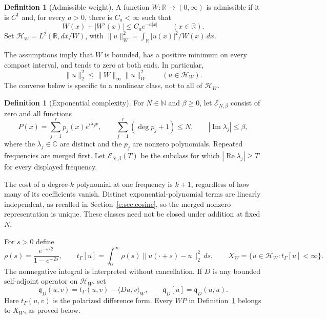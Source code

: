 \documentclass[11pt,a4paper]{article}
\numberwithin{equation}{section}
\theoremstyle{definition}\newtheorem{definition}[theorem]{Definition}
\theoremstyle{remark}\newtheorem{remark}[theorem]{Remark}
\newcommand{\R}{\mathbb R}\newcommand{\C}{\mathbb C}\newcommand{\N}{\mathbb N}
\newcommand{\HH}{\mathcal H_W}\newcommand{\XX}{X_W}\newcommand{\EE}{\mathcal E_{N,\beta}}
\newcommand{\tg}{t_\Gamma}\newcommand{\cg}{c_\Gamma}
\newcommand{\qD}{\mathfrak q_D}\newcommand{\qth}{\mathfrak q_\theta}
\newcommand{\ip}[2]{\langle#1,#2\rangle}\newcommand{\norm}[1]{\lVert#1\rVert}\newcommand{\abs}[1]{\lvert#1\rvert}
\DeclareMathOperator{\Rea}{Re}\DeclareMathOperator{\Ima}{Im}
\begin{document}
\begin{definition}[Admissible weight]\label{e:def:weight}
A function $W:\R\to(0,\infty)$ is admissible if it is $C^1$ and, for every
$a>0$, there is $C_a<\infty$ such that
\begin{equation}\label{e:eq:weight}
 W(x)+|W'(x)|\le C_a e^{-a|x|}\qquad(x\in\R).
\end{equation}
Set $\HH=L^2(\R,dx/W)$, with
$\norm{u}_W^2=\int_\R |u(x)|^2/W(x)\,dx$.
\end{definition}

The assumptions imply that $W$ is bounded, has a positive minimum on every
compact interval, and tends to zero at both ends. In particular,
\begin{equation}\label{e:eq:embedding}
 \norm{u}_2^2\le \norm W_\infty\norm{u}_W^2\qquad(u\in\HH).
\end{equation}
The converse below is specific to a nonlinear class, not to all of $\HH$.

\begin{definition}[Exponential complexity]\label{e:def:complexity}
For $N\in\N$ and $\beta\ge0$, let $\EE$ consist of zero and all functions
\begin{equation}\label{e:eq:exp-poly}
 P(x)=\sum_{j=1}^r p_j(x)e^{i\lambda_jx},\qquad
 \sum_{j=1}^r(\deg p_j+1)\le N,\qquad |\Ima\lambda_j|\le\beta,
\end{equation}
where the $\lambda_j\in\C$ are distinct and the $p_j$ are nonzero
polynomials. Repeated frequencies are merged first. Let $\EE(T)$ be the
subclass for which $|\Rea\lambda_j|\ge T$ for every displayed frequency.
\end{definition}

The cost of a degree-$k$ polynomial at one frequency is $k+1$, regardless
of how many of its coefficients vanish. Distinct exponential-polynomial
terms are linearly independent, as recalled in Section~\ref{e:sec:cosine},
so the merged nonzero representation is unique. These classes need not be
closed under addition at fixed $N$.

For $s>0$ define
\begin{equation}\label{e:eq:gamma-form}
 \rho(s)=\frac{e^{-s/2}}{1-e^{-2s}},\qquad
 \tg[u]=\int_0^\infty\rho(s)\norm{u(\cdot+s)-u}_2^2\,ds,
 \qquad \XX=\{u\in\HH:\tg[u]<\infty\}.
\end{equation}
The nonnegative integral is interpreted without cancellation. If $D$ is
any bounded self-adjoint operator on $\HH$, set
\begin{equation}\label{e:eq:q}
 \qD(u,v)=\tg(u,v)-\ip{Du}{v}_W,\qquad
 \qD[u]=\qD(u,u).
\end{equation}
Here $\tg(u,v)$ is the polarized difference form. Every $WP$ in
Definition~\ref{e:def:complexity} belongs to $\XX$, as proved below.
\end{document}
